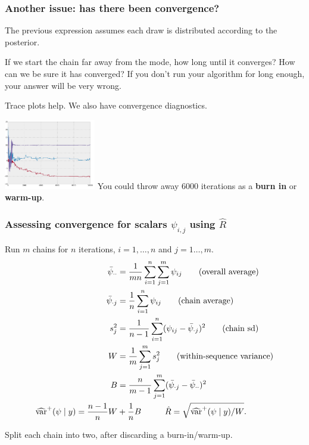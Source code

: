 \documentclass{beamer}
\begin{document}
\begin{frame}
\frametitle{Another issue: has there been convergence?}

The previous expression assumes each draw is distributed according to the posterior. 
\newline

If we start the chain far away from the mode, how long until it converges? How can we be sure it has converged? If you don't run your algorithm for long enough, your answer will be very wrong.
\newline
\pause

Trace plots help. We also have convergence diagnostics.
\newline

\includegraphics[width=40mm]{convergence.png} You could throw away $6000$ iterations as a {\bf burn in} or {\bf warm-up}.

\end{frame}

\begin{frame}
\frametitle{Assessing convergence for scalars $\psi_{i,j}$ using $\hat{R}$}

Run $m$ chains for $n$ iterations, $i=1,\ldots,n$ and $j=1\ldots,m$.
\begin{align*}
\bar{\psi}_{\cdot \cdot} &= \frac{1}{mn}\sum_{i=1}^n\sum_{j=1}^m \psi_{ij} \tag{overall average} \\
\bar{\psi}_{\cdot j} &= \frac{1}{n}\sum_{i=1}^n \psi_{ij} \tag{chain average} \\
s^2_j &= \frac{1}{n-1}\sum_{i=1}^n (\psi_{ij}-\bar{\psi}_{\cdot j})^2 \tag{chain sd} \\
W &= \frac{1}{m} \sum_{j=1}^m s^2_j \tag{within-sequence variance} \\
B &= \frac{n}{m-1} \sum_{j=1}^m (\bar{\psi}_{\cdot j} - \bar{\psi}_{\cdot \cdot})^2\\
\widehat{\text{var}}^{+}(\psi \mid y) =\frac{n-1}{n}W &+ \frac{1}{n}B \hspace{10mm} \hat{R} = \sqrt{\widehat{\text{var}}^{+}(\psi \mid y) / W}.
\end{align*}

Split each chain into two, after discarding a burn-in/warm-up.
\end{frame}
\end{document}
